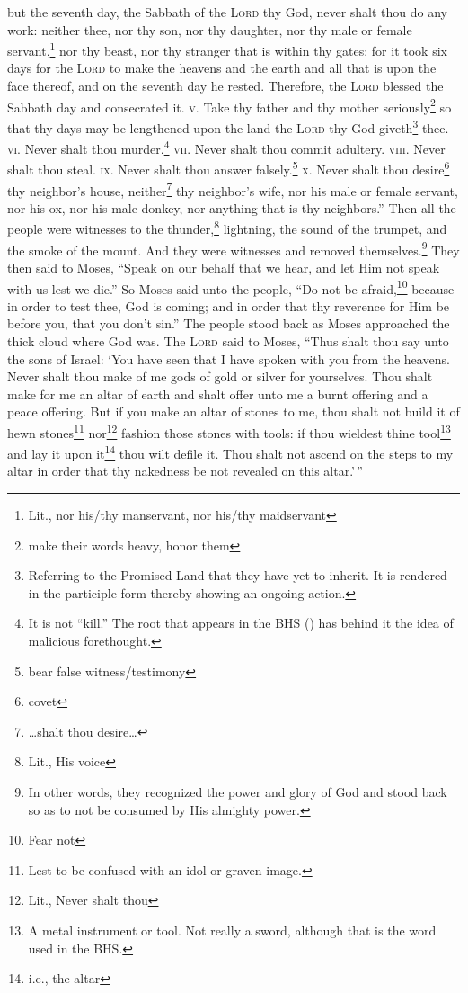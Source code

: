 \begin{enumerate}[align=center]
     but the seventh day, the Sabbath of the \textsc{Lord} thy God, never shalt thou do any work: neither thee, nor thy son, nor thy daughter, nor thy male or female servant,\footnote{Lit., nor his/thy manservant, nor his/thy maidservant} nor thy beast, nor thy stranger that is within thy gates:%
     for it took six days for the \textsc{Lord} to make the heavens and the earth and all that is upon the face thereof, and on the seventh day he rested. Therefore, the \textsc{Lord} blessed the Sabbath day and consecrated it.%
     \textsc{v.} Take thy father and thy mother seriously\footnote{make their words heavy, honor them} so that thy days may be lengthened upon the land the \textsc{Lord} thy God giveth\footnote{Referring to the Promised Land that they have yet to inherit. It is rendered in the participle form thereby showing an ongoing action.} thee.%
     \textsc{vi.} Never shalt thou murder.\footnote{It is not ``kill.'' The root that appears in the BHS () has behind it the idea of malicious forethought.}%
     \textsc{vii.} Never shalt thou commit adultery.%
     \textsc{viii.} Never shalt thou steal.%
     \textsc{ix.} Never shalt thou answer falsely.\footnote{bear false witness/testimony}%
     \textsc{x.} Never shalt thou desire\footnote{covet} thy neighbor's house, neither\footnote{\dots shalt thou desire\dots} thy neighbor's wife, nor his male or female servant, nor his ox, nor his male donkey, nor anything that is thy neighbors.''%
     Then all the people were witnesses to the thunder,\footnote{Lit., His voice} lightning, the sound of the trumpet, and the smoke of the mount. And they were witnesses and removed themselves.\footnote{In other words, they recognized the power and glory of God and stood back so as to not be consumed by His almighty power.}%
     They then said to Moses, ``Speak on our behalf that we hear, and let Him not speak with us lest we die.''%
     So Moses said unto the people, ``Do not be afraid,\footnote{Fear not} because in order to test thee, God is coming; and in order that thy reverence for Him be before you, that you don't sin.''%
     The people stood back as Moses approached the thick cloud where God was.%
     The \textsc{Lord} said to Moses, ``Thus shalt thou say unto the sons of Israel: `You have seen that I have spoken with you from the heavens.%
     Never shalt thou make of me gods of gold or silver for yourselves.%
     Thou shalt make for me an altar of earth and shalt offer unto me a burnt offering and a peace offering.%
     But if you make an altar of stones to me, thou shalt not build it of hewn stones\footnote{Lest to be confused with an idol or graven image.} nor\footnote{Lit., Never shalt thou} fashion those stones with tools: if thou wieldest thine tool\footnote{A metal instrument or tool. Not really a sword, although that is the word used in the BHS.} and lay it upon it\footnote{i.e., the altar} thou wilt defile it.%
     Thou shalt not ascend on the steps to my altar in order that thy nakedness be not revealed on this altar.'\,''%
\end{enumerate}
